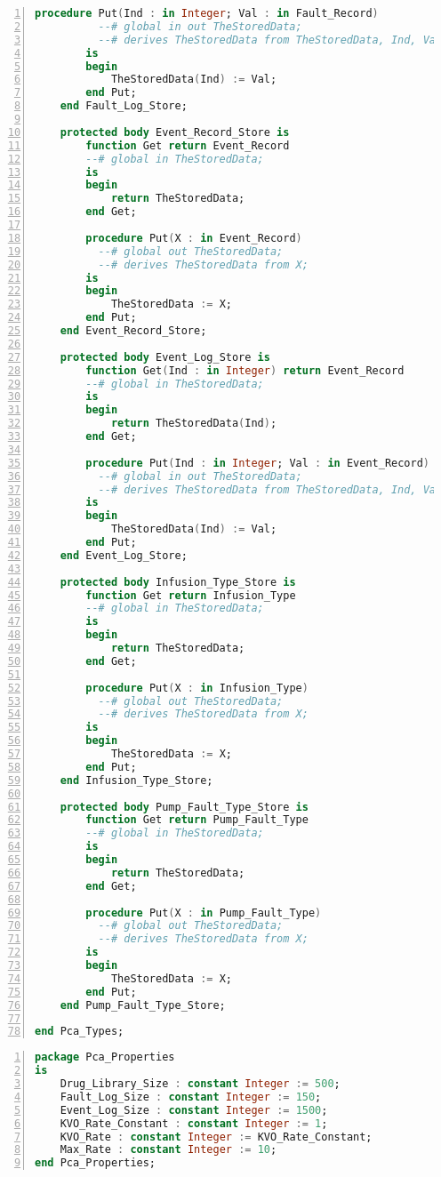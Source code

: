 \begin{lstlisting}[language=ada, gobble=0, numbers=left, caption={\lstinline{Pca_Types} package}, label={listing:pca_generated:pca_types}]
        procedure Put(Ind : in Integer; Val : in Fault_Record)
          --# global in out TheStoredData;
          --# derives TheStoredData from TheStoredData, Ind, Val;
        is
        begin
            TheStoredData(Ind) := Val;
        end Put;
    end Fault_Log_Store;

    protected body Event_Record_Store is
        function Get return Event_Record
        --# global in TheStoredData;
        is
        begin
            return TheStoredData;
        end Get;

        procedure Put(X : in Event_Record)
          --# global out TheStoredData;
          --# derives TheStoredData from X;
        is
        begin
            TheStoredData := X;
        end Put;
    end Event_Record_Store;

    protected body Event_Log_Store is
        function Get(Ind : in Integer) return Event_Record
        --# global in TheStoredData;
        is
        begin
            return TheStoredData(Ind);
        end Get;

        procedure Put(Ind : in Integer; Val : in Event_Record)
          --# global in out TheStoredData;
          --# derives TheStoredData from TheStoredData, Ind, Val;
        is
        begin
            TheStoredData(Ind) := Val;
        end Put;
    end Event_Log_Store;

    protected body Infusion_Type_Store is
        function Get return Infusion_Type
        --# global in TheStoredData;
        is
        begin
            return TheStoredData;
        end Get;

        procedure Put(X : in Infusion_Type)
          --# global out TheStoredData;
          --# derives TheStoredData from X;
        is
        begin
            TheStoredData := X;
        end Put;
    end Infusion_Type_Store;

    protected body Pump_Fault_Type_Store is
        function Get return Pump_Fault_Type
        --# global in TheStoredData;
        is
        begin
            return TheStoredData;
        end Get;

        procedure Put(X : in Pump_Fault_Type)
          --# global out TheStoredData;
          --# derives TheStoredData from X;
        is
        begin
            TheStoredData := X;
        end Put;
    end Pump_Fault_Type_Store;

end Pca_Types;
\end{lstlisting} 
\doublespacing


\singlespacing
\begin{lstlisting}[language=ada, gobble=0, numbers=left, caption={\lstinline{Pca_Properties} package}, label={listing:pca_generated:pca_properties}]
package Pca_Properties
is
    Drug_Library_Size : constant Integer := 500;
    Fault_Log_Size : constant Integer := 150;
    Event_Log_Size : constant Integer := 1500;
    KVO_Rate_Constant : constant Integer := 1;
    KVO_Rate : constant Integer := KVO_Rate_Constant;
    Max_Rate : constant Integer := 10;
end Pca_Properties;
\end{lstlisting} 
\doublespacing


